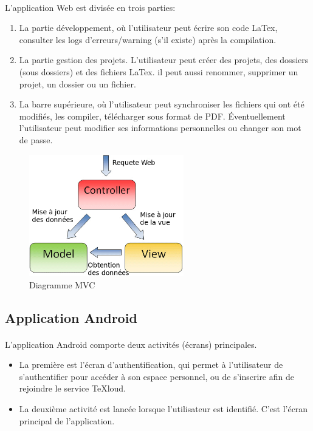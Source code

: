 \documentclass[a4paper,12pt]{article}
\begin{document}
\paragraph*{}
L'application Web est divisée en trois parties:
\begin{enumerate}
 \item La partie développement, où l'utilisateur peut écrire son code LaTex, consulter les logs d'erreurs/warning (s'il existe) après la compilation.
 \item La partie gestion des projets. L'utilisateur peut créer des projets, des dossiers (sous dossiers) et des fichiers LaTex. il peut aussi renommer, supprimer un projet, un dossier ou un fichier.
 \item La barre supérieure, où l'utilisateur peut synchroniser les fichiers qui ont été modifiés, les compiler, télécharger sous format de PDF. Éventuellement l'utilisateur peut modifier ses informations personnelles ou changer son mot de passe.
\end{enumerate}

\clearpage

\begin{figure}[!ht]
\begin{center}
  \includegraphics[width=0.6\textwidth]{./images/MVC.png}
\end{center}
  \caption{Diagramme MVC}
  \label{MVC}
\end{figure}

\subsection{Application Android}
\paragraph*{}
L'application Android comporte deux activités (écrans) principales.
\begin{itemize}
 \item La première est l'écran d'authentification, qui permet à l'utilisateur de s'authentifier pour accéder à son espace personnel, ou de s'inscrire afin de rejoindre le service TeXloud.
 \item La deuxième activité est lancée lorsque l'utilisateur est identifié. C'est l'écran principal de l'application.
\end{itemize}
\end{document}
